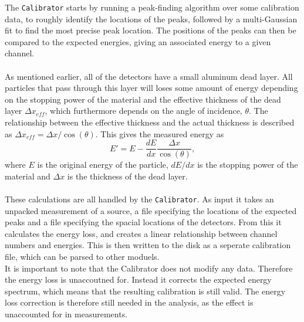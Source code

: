 The \texttt{Calibrator} starts by running a peak-finding algorithm over some calibration data, to roughly identify the locations of the peaks, followed by a multi-Gaussian fit to find the most precise peak location. 
The positions of the peaks can then be compared to the expected energies, giving an associated energy to a given channel. \\\\

As mentioned earlier, all of the detectors have a small aluminum dead layer. All particles that pass through this layer will loses some amount of energy depending on the stopping power of the material and the effective thickness of the dead layer $\Delta x_{eff}$, which furthermore depends on the angle of incidence, $\theta$. 
The relationship between the effective thickness and the actual thickness is described as $\Delta x_{eff} = \Delta x/ \cos(\theta)$. This gives the measured energy as 
\begin{equation*}
E' = E - \dfrac{dE}{dx} \dfrac{\Delta x}{\cos(\theta)},
\end{equation*}
where $E$ is the original energy of the particle, $dE/dx$ is the stopping power of the material and $\Delta x$ is the thickness of the dead layer. \\
\\
These calculations are all handled by the \texttt{Calibrator}. 
As input it takes an unpacked measurement of a source, a file specifying the locations of the expected peaks and a file specifying the spacial locations of the detectors. 
From this it calculates the energy loss, and creates a linear relationship between channel numbers and energies. This is then written to the disk as a seperate calibration file, which can be parsed to other moduels.\\
It is important to note that the Calibrator does not modify any data. Therefore the energy loss is unaccoutned for. Instead it corrects the expected energy spectrum, which means that the resulting calibration is still valid. The energy loss correction is therefore still needed in the analysis, as the effect is unaccounted for in measurements. 
